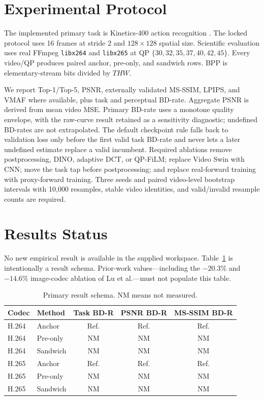 \documentclass[conference]{IEEEtran}
\begin{document}
\section{Experimental Protocol}
The implemented primary task is Kinetics-400 action recognition \cite{kay2017kinetics}. The locked protocol uses 16 frames at stride 2 and $128\times128$ spatial size. Scientific evaluation uses real FFmpeg \texttt{libx264} and \texttt{libx265} at QP $\{30,32,35,37,40,42,45\}$. Every video/QP produces paired anchor, pre-only, and sandwich rows. BPP is elementary-stream bits divided by $THW$.

We report Top-1/Top-5, PSNR, externally validated MS-SSIM, LPIPS, and VMAF where available, plus task and perceptual BD-rate. Aggregate PSNR is derived from mean video MSE. Primary BD-rate uses a monotone quality envelope, with the raw-curve result retained as a sensitivity diagnostic; undefined BD-rates are not extrapolated. The default checkpoint rule falls back to validation loss only before the first valid task BD-rate and never lets a later undefined estimate replace a valid incumbent. Required ablations remove postprocessing, DINO, adaptive DCT, or QP-FiLM; replace Video Swin with CNN; move the task tap before postprocessing; and replace real-forward training with proxy-forward training. Three seeds and paired video-level bootstrap intervals with 10,000 resamples, stable video identities, and valid/invalid resample counts are required.

\section{Results Status}
No new empirical result is available in the supplied workspace. Table~\ref{tab:results} is intentionally a result schema. Prior-work values---including the $-20.3\%$ and $-14.6\%$ image-codec ablation of Lu et al.---must not populate this table.

\begin{table}[t]
\centering
\caption{Primary result schema. NM means not measured.}
\label{tab:results}
\begin{tabular}{llccc}
\toprule
Codec & Method & Task BD-R & PSNR BD-R & MS-SSIM BD-R\\
\midrule
H.264 & Anchor & Ref. & Ref. & Ref.\\
H.264 & Pre-only & NM & NM & NM\\
H.264 & Sandwich & NM & NM & NM\\
H.265 & Anchor & Ref. & Ref. & Ref.\\
H.265 & Pre-only & NM & NM & NM\\
H.265 & Sandwich & NM & NM & NM\\
\bottomrule
\end{tabular}
\end{table}
\end{document}
